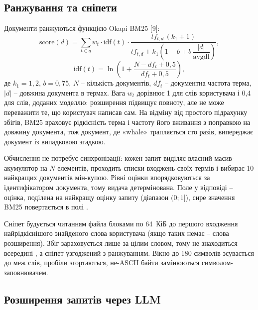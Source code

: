 \subsection{Ранжування та сніпети}

Документи ранжуються функцією Okapi BM25 [9]:
\begin{equation}
\mathrm{score}(d) = \sum_{t \in q} w_t \cdot \mathrm{idf}(t) \cdot
\frac{tf_{t,d}\,(k_1 + 1)}{tf_{t,d} + k_1\left(1 - b + b\,\dfrac{|d|}{\mathrm{avgdl}}\right)},
\end{equation}
\begin{equation}
\mathrm{idf}(t) = \ln\!\left(1 + \frac{N - df_t + 0{,}5}{df_t + 0{,}5}\right),
\end{equation}
де $k_1 = 1{,}2$, $b = 0{,}75$, $N$ -- кількість документів, $df_t$ -- документна частота
терма, $|d|$ -- довжина документа в термах. Вага $w_t$ дорівнює 1 для слів користувача і 0,4 для
слів, доданих моделлю: розширення підвищує повноту, але не може переважити те, що
користувач написав сам. На відміну від простого підрахунку збігів, BM25 враховує
рідкісність терма і частоту його вживання з поправкою на довжину документа, тож документ,
де «whale» трапляється сто разів, випереджає документ із випадковою згадкою.

Обчислення не потребує синхронізації: кожен запит виділяє власний масив-акумулятор на $N$
елементів, проходить списки входжень своїх термів і вибирає 10 найкращих документів
мін-купою. Рівні оцінки впорядковуються за ідентифікатором документа, тому видача
детермінована. Поле  у відповіді -- оцінка, поділена на найкращу оцінку запиту
(діапазон $(0; 1]$), сире значення BM25 повертається в полі .

Сніпет будується читанням файла блоками по 64~КіБ до першого входження найрідкіснішого
знайденого слова користувача (якщо таких немає -- слова розширення). Збіг зараховується лише
за цілим словом, тому  не знаходиться всередині , а сніпет
узгоджений з ранжуванням. Вікно до 180 символів зсувається до меж слів, пробіли згортаються,
не-ASCII байти замінюються символом-заповнювачем.

\subsection{Розширення запитів через LLM}

